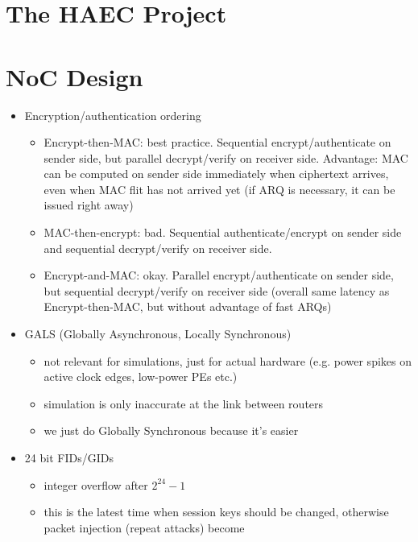 \documentclass[
	paper=a4,
	fontsize=11pt,
	parskip=full %
]{scrreprt}
\begin{document}
    \chapter{The HAEC Project}

    \chapter{NoC Design}
    \begin{itemize}
        \item Encryption/authentication ordering
            \begin{itemize}
                \item Encrypt-then-MAC: best practice. Sequential encrypt/authenticate on sender side, but parallel decrypt/verify
                    on receiver side. Advantage: MAC can be computed on sender side immediately when ciphertext arrives, even when
                    MAC flit has not arrived yet (if ARQ is necessary, it can be issued right away)
                \item MAC-then-encrypt: bad. Sequential authenticate/encrypt on sender side and sequential decrypt/verify on receiver
                    side.
                \item Encrypt-and-MAC: okay. Parallel encrypt/authenticate on sender side, but sequential decrypt/verify on receiver
                    side (overall same latency as Encrypt-then-MAC, but without advantage of fast ARQs)
            \end{itemize}
        \item GALS (Globally Asynchronous, Locally Synchronous)
            \begin{itemize}
                \item not relevant for simulations, just for actual hardware (e.g. power spikes on active clock edges, low-power PEs etc.)
                \item simulation is only inaccurate at the link between routers
                \item we just do Globally Synchronous because it's easier
            \end{itemize}
        \item 24 bit FIDs/GIDs
            \begin{itemize}
                \item integer overflow after $2^{24}-1$
                \item this is the latest time when session keys should be changed, otherwise packet injection (repeat attacks) become

\end{itemize}
\end{itemize}
\end{document}
